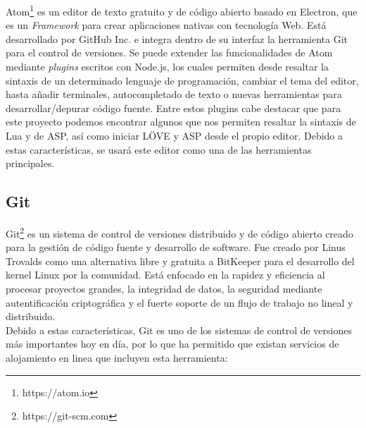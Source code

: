Atom\footnote{https://atom.io} es un editor de texto gratuito y de código abierto basado en Electron, que es un \textit{Framework} para crear aplicaciones nativas con tecnología Web. Está desarrollado por GitHub Inc. e integra dentro de su interfaz la herramienta Git para el control de versiones. Se puede extender las funcionalidades de Atom mediante \textit{plugins} escritos con Node.js, los cuales permiten desde resaltar la sintaxis de un determinado lenguaje de programación, cambiar el tema del editor, hasta añadir terminales, autocompletado de texto o nuevas herramientas para desarrollar/depurar código fuente. Entre estos plugins cabe destacar que para este proyecto podemos encontrar algunos que nos permiten resaltar la sintaxis de Lua y de ASP, así como iniciar LÖVE y ASP desde el propio editor. Debido a estas características, se usará este editor como una de las herramientas principales.

\subsection{Git}

Git\footnote{https://git-scm.com} es un sistema de control de versiones distribuido y de código abierto creado para la gestión de código fuente y desarrollo de software. Fue creado por Linus Trovalds como una alternativa libre y gratuita a BitKeeper para el desarrollo del kernel Linux por la comunidad. Está enfocado en la rapidez y eficiencia al procesar proyectos grandes, la integridad de datos, la seguridad mediante autentificación criptográfica y el fuerte soporte de un flujo de trabajo no lineal y distribuido. \\

Debido a estas características, Git es uno de los sistemas de control de versiones más importantes hoy en día, por lo que ha permitido que existan servicios de alojamiento en linea que incluyen esta herramienta:

